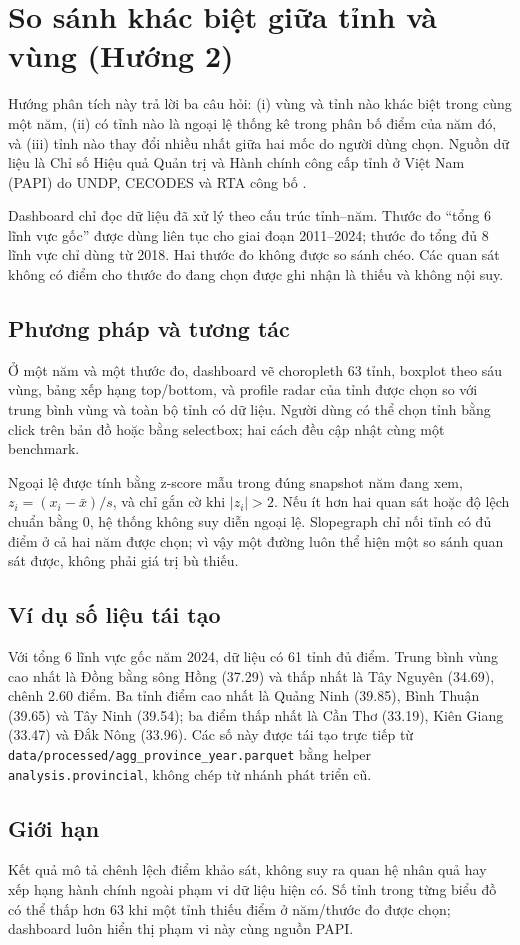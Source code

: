 \section{So sánh khác biệt giữa tỉnh và vùng (Hướng 2)}

Hướng phân tích này trả lời ba câu hỏi: (i) vùng và tỉnh nào khác biệt trong
cùng một năm, (ii) có tỉnh nào là ngoại lệ thống kê trong phân bố điểm của năm
đó, và (iii) tỉnh nào thay đổi nhiều nhất giữa hai mốc do người dùng chọn.
Nguồn dữ liệu là Chỉ số Hiệu quả Quản trị và Hành chính công cấp tỉnh ở Việt
Nam (PAPI) do UNDP, CECODES và RTA công bố \cite{papi_vietnam}.

Dashboard chỉ đọc dữ liệu đã xử lý theo cấu trúc tỉnh--năm. Thước đo ``tổng 6
lĩnh vực gốc'' được dùng liên tục cho giai đoạn 2011--2024; thước đo tổng đủ 8
lĩnh vực chỉ dùng từ 2018. Hai thước đo không được so sánh chéo. Các quan sát
không có điểm cho thước đo đang chọn được ghi nhận là thiếu và không nội suy.

\subsection{Phương pháp và tương tác}

Ở một năm và một thước đo, dashboard vẽ choropleth 63 tỉnh, boxplot theo sáu
vùng, bảng xếp hạng top/bottom, và profile radar của tỉnh được chọn so với
trung bình vùng và toàn bộ tỉnh có dữ liệu. Người dùng có thể chọn tỉnh bằng
click trên bản đồ hoặc bằng selectbox; hai cách đều cập nhật cùng một benchmark.

Ngoại lệ được tính bằng z-score mẫu trong đúng snapshot năm đang xem,
\(z_i=(x_i-\bar{x})/s\), và chỉ gắn cờ khi \(|z_i|>2\). Nếu ít hơn hai quan
sát hoặc độ lệch chuẩn bằng 0, hệ thống không suy diễn ngoại lệ. Slopegraph chỉ
nối tỉnh có đủ điểm ở cả hai năm được chọn; vì vậy một đường luôn thể hiện một
so sánh quan sát được, không phải giá trị bù thiếu.

\subsection{Ví dụ số liệu tái tạo}

Với tổng 6 lĩnh vực gốc năm 2024, dữ liệu có 61 tỉnh đủ điểm. Trung bình vùng
cao nhất là Đồng bằng sông Hồng (37.29) và thấp nhất là Tây Nguyên (34.69),
chênh 2.60 điểm. Ba tỉnh điểm cao nhất là Quảng Ninh (39.85), Bình Thuận
(39.65) và Tây Ninh (39.54); ba điểm thấp nhất là Cần Thơ (33.19), Kiên Giang
(33.47) và Đắk Nông (33.96). Các số này được tái tạo trực tiếp từ
\texttt{data/processed/agg\_province\_year.parquet} bằng helper
\texttt{analysis.provincial}, không chép từ nhánh phát triển cũ.

\subsection{Giới hạn}

Kết quả mô tả chênh lệch điểm khảo sát, không suy ra quan hệ nhân quả hay xếp
hạng hành chính ngoài phạm vi dữ liệu hiện có. Số tỉnh trong từng biểu đồ có thể
thấp hơn 63 khi một tỉnh thiếu điểm ở năm/thước đo được chọn; dashboard luôn
hiển thị phạm vi này cùng nguồn PAPI.
